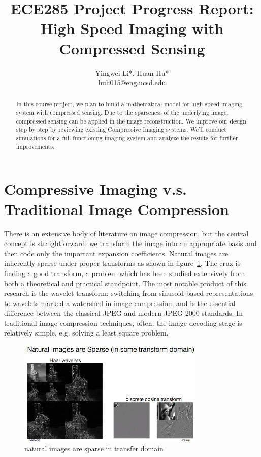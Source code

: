 \documentclass{article} %
\title{ECE285 Project Progress Report: High Speed Imaging with Compressed Sensing}
\author{
Yingwei Li*, Huan Hu* \\
\AND huh015@eng.ucsd.edu
}
\begin{document}
\maketitle

\begin{abstract}
In this course project, we plan to build a mathematical model for high speed imaging system with compressed sensing. Due to the sparseness of the underlying image, compressed sensing can be applied in the image reconstruction. We improve our design step by step by reviewing existing Compressive Imaging systems. We'll conduct simulations for a full-functioning imaging system and analyze the results for further improvements.
\end{abstract}

\section{Compressive Imaging v.s. Traditional Image Compression} There is an extensive body of literature on image compression, but the central concept is straightforward: we transform the image into an appropriate basis and then code only the important expansion coefficients. Natural images are inherently sparse under proper transforms as shown in figure~\ref{fig:naturalSparse}. The crux is finding a good transform, a problem which has been studied extensively from both a theoretical and practical standpoint. The most notable product of this research is the wavelet transform; switching from sinusoid-based representations to wavelets marked a watershed in image compression, and is the essential difference between the classical JPEG and modern JPEG-2000 standards.  In traditional image compression techniques, often, the image decoding stage is relatively simple, e.g. solving a least square problem.
\begin{figure}[!h]
\centering
\includegraphics[width=3.5in]{naturalSparse.png}
\caption{natural images are sparse in transfer domain }
\label{fig:naturalSparse}
\end{figure}
\end{document}

